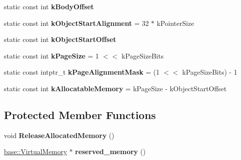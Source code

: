 \begin{DoxyCompactItemize}
\item 
static const int {\bfseries k\+Body\+Offset}
\item 
static const int {\bfseries k\+Object\+Start\+Alignment} = 32 $\ast$ k\+Pointer\+Size\hypertarget{classv8_1_1internal_1_1_memory_chunk_ac2a0cdf9458acf5ae6483384a72b18c2}{}\label{classv8_1_1internal_1_1_memory_chunk_ac2a0cdf9458acf5ae6483384a72b18c2}

\item 
static const int {\bfseries k\+Object\+Start\+Offset}
\item 
static const int {\bfseries k\+Page\+Size} = 1 $<$$<$ k\+Page\+Size\+Bits\hypertarget{classv8_1_1internal_1_1_memory_chunk_ad3fb50a7edf5e288244370fa3b2a3da4}{}\label{classv8_1_1internal_1_1_memory_chunk_ad3fb50a7edf5e288244370fa3b2a3da4}

\item 
static const intptr\+\_\+t {\bfseries k\+Page\+Alignment\+Mask} = (1 $<$$<$ k\+Page\+Size\+Bits) -\/ 1\hypertarget{classv8_1_1internal_1_1_memory_chunk_ab17c488c2dd31bce8fed2a888fe00d83}{}\label{classv8_1_1internal_1_1_memory_chunk_ab17c488c2dd31bce8fed2a888fe00d83}

\item 
static const int {\bfseries k\+Allocatable\+Memory} = k\+Page\+Size -\/ k\+Object\+Start\+Offset\hypertarget{classv8_1_1internal_1_1_memory_chunk_af13a1aa127e3e9931d3536c535f6e8b6}{}\label{classv8_1_1internal_1_1_memory_chunk_af13a1aa127e3e9931d3536c535f6e8b6}

\end{DoxyCompactItemize}
\subsection*{Protected Member Functions}
\begin{DoxyCompactItemize}
\item 
void {\bfseries Release\+Allocated\+Memory} ()\hypertarget{classv8_1_1internal_1_1_memory_chunk_a3a18c35d669c988d169bc0fabad4230a}{}\label{classv8_1_1internal_1_1_memory_chunk_a3a18c35d669c988d169bc0fabad4230a}

\item 
\hyperlink{classv8_1_1base_1_1_virtual_memory}{base\+::\+Virtual\+Memory} $\ast$ {\bfseries reserved\+\_\+memory} ()\hypertarget{classv8_1_1internal_1_1_memory_chunk_a10cce2b6c4ee3f96c30fe66e7e481f18}{}\label{classv8_1_1internal_1_1_memory_chunk_a10cce2b6c4ee3f96c30fe66e7e481f18}

\end{DoxyCompactItemize}
